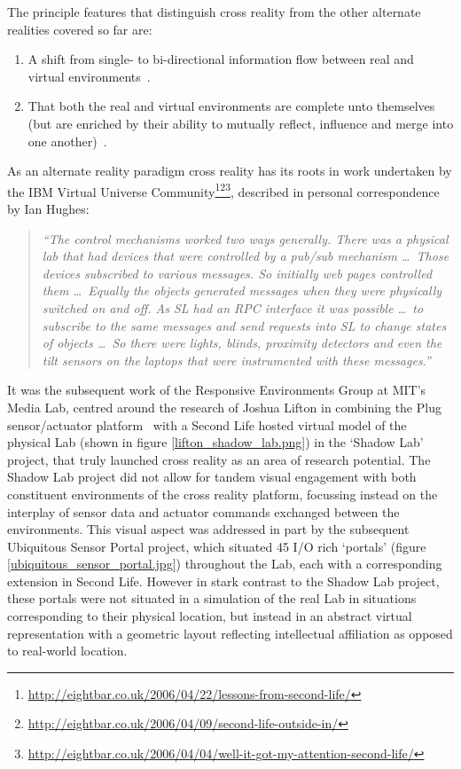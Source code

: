 The principle features that distinguish cross reality from the other alternate realities covered so far are:
\begin{enumerate}
	\item A shift from single- to bi-directional information flow between real and virtual environments~\cite{kim:practical}.
	\item That both the real and virtual environments are complete unto themselves (but are enriched by their ability to mutually reflect, influence and merge into one another)~\cite{lifton:merging}.
\end{enumerate}


As an alternate reality paradigm cross reality has its roots in work undertaken by the IBM Virtual Universe Community\footnote{\url{http://eightbar.co.uk/2006/04/22/lessons-from-second-life/}}\footnote{\url{http://eightbar.co.uk/2006/04/09/second-life-outside-in/}}\footnote{\url{http://eightbar.co.uk/2006/04/04/well-it-got-my-attention-second-life/}}, described in personal correspondence by Ian Hughes:

\begin{quote}
\textit{``The control mechanisms worked two ways generally. There was a physical lab that had devices that were controlled by a pub/sub mechanism \ldots\ Those devices subscribed to various messages. So initially web pages controlled them \ldots\ Equally the objects generated messages when they were physically switched on and off. As SL\SLfootnote{} had an RPC interface it was possible \ldots\ to subscribe to the same messages and send requests into SL to change states of objects \ldots\ So there were lights, blinds, proximity detectors and even the tilt sensors on the laptops that were instrumented with these messages.''}
\end{quote}

It was the subsequent work of the Responsive Environments Group at MIT's Media Lab, centred around the research of Joshua Lifton in combining the Plug sensor/actuator platform~\cite{Lifton2007b} with a Second Life hosted virtual model of the physical Lab (shown in figure \ref{lifton_shadow_lab.png}) in the `Shadow Lab' project, that truly launched cross reality as an area of research potential. The Shadow Lab project did not allow for tandem visual engagement with both constituent environments of the cross reality platform, focussing instead on the interplay of sensor data and actuator commands exchanged between the environments. This visual aspect was addressed in part by the subsequent Ubiquitous Sensor Portal project, which situated 45 I/O rich `portals' (figure \ref{ubiquitous_sensor_portal.jpg}) throughout the Lab, each with a corresponding extension in Second Life. However in stark contrast to the Shadow Lab project, these portals were not situated in a simulation of the real Lab in situations corresponding to their physical location, but instead in an abstract virtual representation with a geometric layout reflecting intellectual affiliation as opposed to real-world location.

